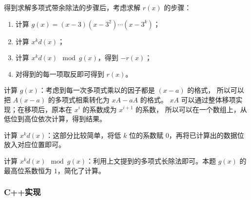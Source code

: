 得到求解多项式带余除法的步骤后，考虑求解 $r(x)$ 的步骤：

\begin{enumerate}
    \item 计算 $g(x)=(x-3)(x-3^2)\cdots(x-3^k)$；
    \item 计算 $x^kd(x)$；
    \item 计算 $x^kd(x) \mod g(x)$，得到 $-r(x)$；
    \item 对得到的每一项取反即可得到 $r(x)$。
\end{enumerate}

计算 $g(x)$：考虑到每一次多项式乘以的因子都是 $(x-a)$ 的格式，
所以可以把 $A(x-a)$ 的多项式相乘转化为 $xA-aA$ 的格式。
$xA$ 可以通过整体移项实现；在移项后，原本在 $x^i$ 的系数成为 $x^{i+1}$ 的系数，
所以可以在一个数组上，从低位到高位依次计算，得到结果。

计算 $x^kd(x)$：这部分比较简单，将低 $k$ 位的系数赋 $0$，再将已计算出的数据位放入对应位置即可。

计算 $x^kd(x) \mod g(x)$：利用上文提到的多项式长除法即可。本题 $g(x)$ 的最高位系数恒为 $1$，简化了计算。

\subsubsection{C++实现}

